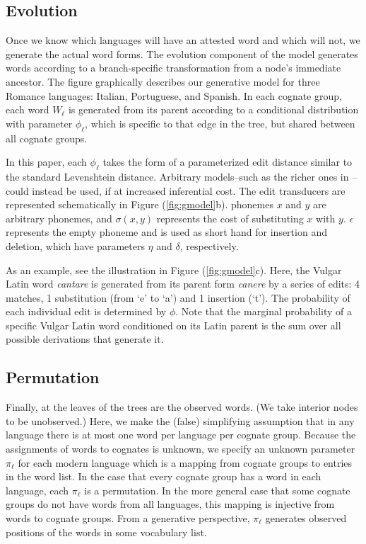 \documentclass[11pt,a4paper]{article}
\begin{document}
\subsection{Evolution}

Once we know which languages will have an attested word and which
will not, we generate the actual word forms. The evolution component of
the model generates words according to a branch-specific transformation from a node's 
immediate ancestor.  The figure graphically describes our generative
model for three Romance languages: Italian, Portuguese, and Spanish.
In each cognate group, each word $W_\ell$ is generated from its
parent according to a conditional distribution with parameter $\phi_\ell$,
which is specific to that edge in the tree, but shared between all
cognate groups.

In this paper, each $\phi_\ell$ takes the form of a parameterized
edit distance similar to the standard Levenshtein distance.  Arbitrary
models--such as the richer ones in --could
instead be used, if at increased inferential cost.   The edit
transducers are represented schematically in Figure (\ref{fig:gmodel}b).
phonemes $x$ and $y$ are arbitrary phonemes, and $\sigma(x,y)$
represents the cost of substituting $x$ with $y$.  $\epsilon$
represents the empty phoneme and is used as short hand for insertion
and deletion, which have parameters $\eta$ and $\delta$, respectively.

As an example, see the illustration in Figure (\ref{fig:gmodel}c).
Here, the Vulgar Latin word \textit{cantare} is generated from its
parent form \textit{canere} by a series of edits: 4 matches, 1
substitution (from `e' to `a') and 1 insertion (`t').
The probability of each individual edit is determined by $\phi$.
Note that the marginal probability of a specific Vulgar Latin word
conditioned on its Latin parent is the sum over all possible
derivations that generate it.

\subsection{Permutation}

Finally, at the leaves of the trees are the observed words. (We
take interior nodes to be unobserved.) Here, we make the (false)
simplifying assumption that in any language there is at most one
word per language per cognate group. Because the assignments of
words to cognates is unknown, we specify an unknown parameter
$\pi_\ell$ for each modern language which is a mapping from cognate
groups to entries in the word list. In the case that every cognate
group has a word in each language, each $\pi_\ell$ is a permutation.
In the more general case that some cognate groups do not have words
from all languages, this mapping is injective from words to cognate
groups. From a generative perspective, $\pi_\ell$ generates observed
positions of the words in some vocabulary list.
\end{document}
